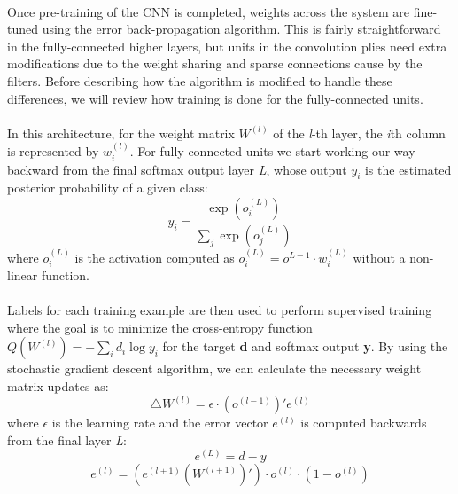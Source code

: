 \documentclass[letterpaper]{article}
\begin{document}
\paragraph{} Once pre-training of the CNN is completed, weights across the system are fine-tuned using the error back-propagation algorithm. This is fairly straightforward in the fully-connected higher layers, but units in the convolution plies need extra modifications due to the weight sharing and sparse connections cause by the filters. Before describing how the algorithm is modified to handle these differences, we will review how training is done for the fully-connected units.

\paragraph{} In this architecture, for the weight matrix $W^{(l)}$ of the \textit{l}-th layer, the \textit{i}th column is represented by $w_{i}^{(l)}$. For fully-connected units we start working our way backward from the final softmax output layer \textit{L}, whose output $y_{i}$ is the estimated posterior probability of a given class:
\begin{equation*}
	y_{i} = \frac{\exp(o_{i}^{(L)})}{\sum_{j}\exp(o_{j}^{(L)})}
\end{equation*}
where $o_{i}^{(L)}$ is the activation computed as $o_{i}^{(L)} = o^{L-1}\cdot w_{i}^{(L)}$ without a non-linear function.

\paragraph{} Labels for each training example are then used to perform supervised training where the goal is to minimize the cross-entropy function $Q({W^{(l)}}) = -\sum_{i}d_{i}\log{y_{i}}$ for the target \textbf{d} and softmax output \textbf{y}. By using the  stochastic gradient descent algorithm, we can calculate the necessary weight matrix updates as:
\begin{equation*}
	\triangle{W^{(l)}} = \epsilon \cdot (o^{(l-1)})' e^{(l)}
\end{equation*}
where $\epsilon$ is the learning rate and the error vector $e^{(l)}$ is computed backwards from the final layer \textit{L}:
\begin{equation*}
	e^{(L)} = d - y
\end{equation*}
\begin{equation*}
	e^{(l)} = (e^{(l+1)}(W^{(l+1)})') \cdot o^{(l)} \cdot (1-o^{(l)}) 
\end{equation*}
\end{document}

